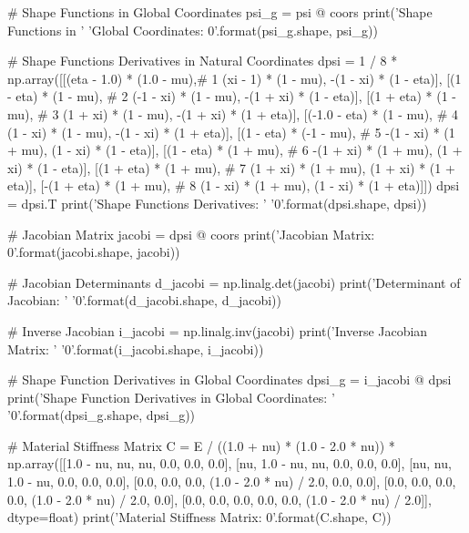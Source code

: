 \documentclass[10pt,b5paper,titlepage]{book}
\begin{document}
\begin{python}
    # Shape Functions in Global Coordinates
    psi_g = psi @ coors
    print('Shape Functions in '
          'Global Coordinates: {0}'.format(psi_g.shape, psi_g))

    # Shape Functions Derivatives in Natural Coordinates
    dpsi = 1 / 8 * np.array([[(eta - 1.0) * (1.0 - mu),# 1
                              (xi - 1) * (1 - mu),
                             -(1 - xi) * (1 - eta)],
                             [(1 - eta) * (1 - mu),    # 2
                              (-1 - xi) * (1 - mu),
                             -(1 + xi) * (1 - eta)],
                             [(1 + eta) * (1 - mu),    # 3
                              (1 + xi) * (1 - mu),
                             -(1 + xi) * (1 + eta)],
                             [(-1.0 - eta) * (1 - mu), # 4
                              (1 - xi) * (1 - mu),
                             -(1 - xi) * (1 + eta)],
                             [(1 - eta) * (-1 - mu),   # 5
                             -(1 - xi) * (1 + mu),
                              (1 - xi) * (1 - eta)],
                             [(1 - eta) * (1 + mu),    # 6
                             -(1 + xi) * (1 + mu),
                              (1 + xi) * (1 - eta)],
                             [(1 + eta) * (1 + mu),    # 7
                              (1 + xi) * (1 + mu),
                              (1 + xi) * (1 + eta)],
                             [-(1 + eta) * (1 + mu),   # 8
                              (1 - xi) * (1 + mu),
                              (1 - xi) * (1 + eta)]])
    dpsi = dpsi.T
    print('Shape Functions Derivatives: '
          '{0}'.format(dpsi.shape, dpsi))

    # Jacobian Matrix
    jacobi = dpsi @ coors
    print('Jacobian Matrix: {0}'.format(jacobi.shape, jacobi))

    # Jacobian Determinants
    d_jacobi = np.linalg.det(jacobi)
    print('Determinant of Jacobian: '
          '{0}'.format(d_jacobi.shape, d_jacobi))

    # Inverse Jacobian
    i_jacobi = np.linalg.inv(jacobi)
    print('Inverse Jacobian Matrix: '
          '{0}'.format(i_jacobi.shape, i_jacobi))

    # Shape Function Derivatives in Global Coordinates
    dpsi_g = i_jacobi @ dpsi
    print('Shape Function Derivatives in Global Coordinates: '
          '{0}'.format(dpsi_g.shape, dpsi_g))

    # Material Stiffness Matrix
    C = E / ((1.0 + nu) * (1.0 - 2.0 * nu)) *
        np.array([[1.0 - nu, nu, nu, 0.0, 0.0, 0.0],
                  [nu, 1.0 - nu, nu, 0.0, 0.0, 0.0],
                  [nu, nu, 1.0 - nu, 0.0, 0.0, 0.0],
                  [0.0, 0.0, 0.0, (1.0 - 2.0 * nu) / 2.0, 0.0, 0.0],
                  [0.0, 0.0, 0.0, 0.0, (1.0 - 2.0 * nu) / 2.0, 0.0],
                  [0.0, 0.0, 0.0, 0.0, 0.0, (1.0 - 2.0 * nu) / 2.0]],
                  dtype=float)
    print('Material Stiffness Matrix: {0}'.format(C.shape, C))


\end{python}
\end{document}
